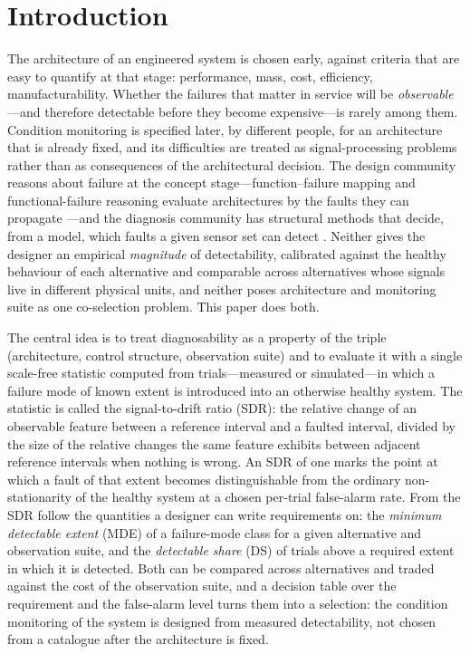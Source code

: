 \section{Introduction}\label{sec:intro}

The architecture of an engineered system is chosen early, against criteria that are easy to quantify at that stage: performance, mass, cost, efficiency, manufacturability. Whether the failures that matter in service will be \emph{observable}---and therefore detectable before they become expensive---is rarely among them. Condition monitoring is specified later, by different people, for an architecture that is already fixed, and its difficulties are treated as signal-processing problems rather than as consequences of the architectural decision. The design community reasons about failure at the concept stage---function--failure mapping and functional-failure reasoning evaluate architectures by the faults they can propagate \citep{Tumer2003, Stone2005, Kurtoglu2010}---and the diagnosis community has structural methods that decide, from a model, which faults a given sensor set can detect \citep{Krysander2008, Blanke2016}. Neither gives the designer an empirical \emph{magnitude} of detectability, calibrated against the healthy behaviour of each alternative and comparable across alternatives whose signals live in different physical units, and neither poses architecture and monitoring suite as one co-selection problem. This paper does both.

The central idea is to treat diagnosability as a property of the triple (architecture, control structure, observation suite) and to evaluate it with a single scale-free statistic computed from trials---measured or simulated---in which a failure mode of known extent is introduced into an otherwise healthy system. The statistic is called the signal-to-drift ratio (SDR): the relative change of an observable feature between a reference interval and a faulted interval, divided by the size of the relative changes the same feature exhibits between adjacent reference intervals when nothing is wrong. An SDR of one marks the point at which a fault of that extent becomes distinguishable from the ordinary non-stationarity of the healthy system at a chosen per-trial false-alarm rate. From the SDR follow the quantities a designer can write requirements on: the \emph{minimum detectable extent} (MDE) of a failure-mode class for a given alternative and observation suite, and the \emph{detectable share} (DS) of trials above a required extent in which it is detected. Both can be compared across alternatives and traded against the cost of the observation suite, and a decision table over the requirement and the false-alarm level turns them into a selection: the condition monitoring of the system is designed from measured detectability, not chosen from a catalogue after the architecture is fixed.

